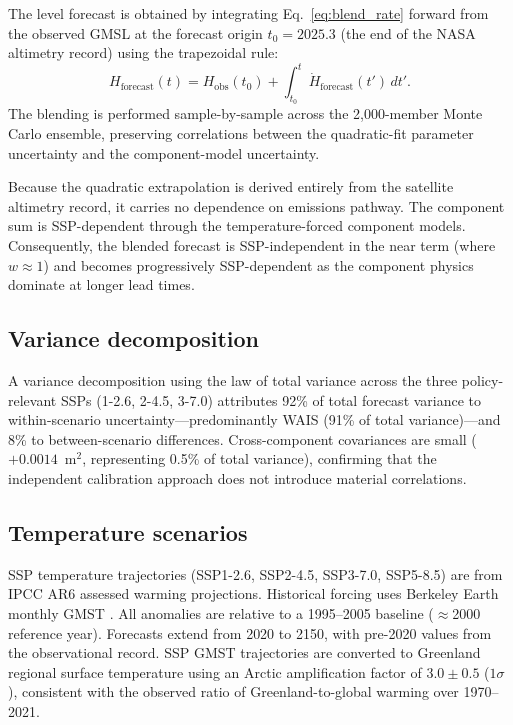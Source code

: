 \documentclass[12pt]{article}
\begin{document}
The level forecast is obtained by integrating Eq.~\eqref{eq:blend_rate} forward from the observed GMSL at the forecast origin $t_0 = 2025.3$ (the end of the NASA altimetry record) using the trapezoidal rule:
\begin{equation}
	H_{\mathrm{forecast}}(t) = H_{\mathrm{obs}}(t_0) + \int_{t_0}^{t} \dot{H}_{\mathrm{forecast}}(t')\,dt'.
	\label{eq:blend_level}
\end{equation}
The blending is performed sample-by-sample across the 2{,}000-member Monte Carlo ensemble, preserving correlations between the quadratic-fit parameter uncertainty and the component-model uncertainty.

Because the quadratic extrapolation is derived entirely from the satellite altimetry record, it carries no dependence on emissions pathway. The component sum is SSP-dependent through the temperature-forced component models. Consequently, the blended forecast is SSP-independent in the near term (where $w \approx 1$) and becomes progressively SSP-dependent as the component physics dominate at longer lead times.

\subsection{Variance decomposition}

A variance decomposition using the law of total variance across the three policy-relevant SSPs (1-2.6, 2-4.5, 3-7.0) attributes 92\% of total forecast variance to within-scenario uncertainty---predominantly WAIS (91\% of total variance)---and 8\% to between-scenario differences. Cross-component covariances are small ($+0.0014$~m$^2$, representing 0.5\% of total variance), confirming that the independent calibration approach does not introduce material correlations.

\subsection{Temperature scenarios}

SSP temperature trajectories (SSP1-2.6, SSP2-4.5, SSP3-7.0, SSP5-8.5) are from IPCC AR6 assessed warming projections. Historical forcing uses Berkeley Earth monthly GMST \citep{Rohde2020}. All anomalies are relative to a 1995--2005 baseline ($\approx$2000 reference year). Forecasts extend from 2020 to 2150, with pre-2020 values from the observational record. SSP GMST trajectories are converted to Greenland regional surface temperature using an Arctic amplification factor of $3.0 \pm 0.5$ ($1\sigma$), consistent with the observed ratio of Greenland-to-global warming over 1970--2021.
\end{document}
